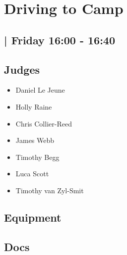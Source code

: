 \documentclass[10pt]{article}
\begin{document}
		\begin{minipage}{\linewidth}
		\setcounter{section}{1}
	\section{Driving to Camp }
	\subsection*{ | Friday 16:00 - 16:40}

	

	\begin{multicols}{2}
	\subsection*{\faUsers \: Judges}
	\begin{itemize}
			\item Daniel Le Jeune
			\item Holly Raine
			\item Chris Collier-Reed
			\item James Webb
			\item Timothy Begg
			\item Luca Scott
			\item Timothy van Zyl-Smit
		\end{itemize}
	\columnbreak
	\subsection*{\faWrench \: Equipment}
	        \vfill\null
        \subsection*{\faFile \: Docs}
     	\end{multicols}


	\vspace{1cm}
	\end{minipage}
\end{document}
